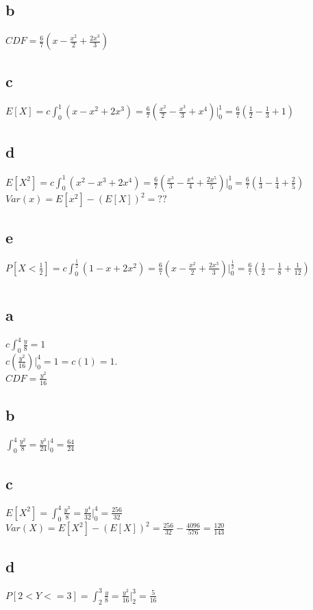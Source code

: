 \documentclass[12pt]{article}
\begin{document}
\subsection*{b}
\(CDF = \frac{6}{7}(x - \frac{x^2}{2} + \frac{2x^3}{3})\)
\subsection*{c}
\(E[X] = c \int_0^1(x - x^2 + 2x^3) = \frac{6}{7}(\frac{x^2}{2} - \frac{x^3}{3} + x^4)|_0^1 = \frac{6}{7}(\frac{1}{2} - \frac{1}{3} + 1)\)
\subsection*{d}
\(E[X^2] = c \int_0^1(x^2 - x^3 + 2x^4) = \frac{6}{7}(\frac{x^3}{3} - \frac{x^4}{4} + \frac{2x^5}{5})|_0^1 = \frac{6}{7}(\frac{1}{3} - \frac{1}{4} + \frac{2}{5})\)\\
\(Var(x) = E[x^2] - (E[X])^2 = ??\)
\subsection*{e}
\(P[X < \frac{1}{2}] = c \int_0^{\frac{1}{2}}(1 - x + 2x^2) = \frac{6}{7}(x-\frac{x^2}{2}+\frac{2x^3}{3})|_0^{\frac{1}{2}} = \frac{6}{7}(\frac{1}{2} - \frac{1}{8} + \frac{1}{12})\)
\section{}
\subsection*{a}
\(c \int_0^4 \frac{y}{8} = 1\)\\
\(c(\frac{y^2}{16})|_0^4 = 1 = c(1) = 1.\)\\
\(CDF = \frac{y^2}{16}\)
\subsection*{b}
\(\int_0^4 \frac{y^2}{8} = \frac{y^3}{24}|_0^4 = \frac{64}{24}\)
\subsection*{c}
\(E[X^2] = \int_0^4 \frac{y^3}{8} = \frac{y^4}{32}|_0^4 = \frac{256}{32}\)\\
\(Var(X) = E[X^2] - (E[X])^2 = \frac{256}{32} - \frac{4096}{576} = \frac{120}{143}\)\\
\subsection*{d}
\(P[2 < Y <= 3] = \int_2^3 \frac{y}{8} = \frac{y^2}{16}|_2^3 = \frac{5}{16}\)
\end{document}
